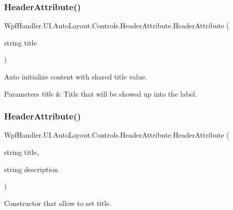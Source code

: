 \subsubsection{\texorpdfstring{Header\+Attribute()}{HeaderAttribute()}\hspace{0.1cm}{\footnotesize\ttfamily [1/4]}}
{\footnotesize\ttfamily Wpf\+Handler.\+U\+I.\+Auto\+Layout.\+Controls.\+Header\+Attribute.\+Header\+Attribute (\begin{DoxyParamCaption}\item[{string}]{title }\end{DoxyParamCaption})}



Auto initialize content with shared title value. 


\begin{DoxyParams}{Parameters}
{\em title} & Title that will be showed up into the label.\\
\hline
\end{DoxyParams}
\mbox{\label{class_wpf_handler_1_1_u_i_1_1_auto_layout_1_1_controls_1_1_header_attribute_aa89774276da07f96c045d13506488df3}} 
\subsubsection{\texorpdfstring{Header\+Attribute()}{HeaderAttribute()}\hspace{0.1cm}{\footnotesize\ttfamily [2/4]}}
{\footnotesize\ttfamily Wpf\+Handler.\+U\+I.\+Auto\+Layout.\+Controls.\+Header\+Attribute.\+Header\+Attribute (\begin{DoxyParamCaption}\item[{string}]{title,  }\item[{string}]{description }\end{DoxyParamCaption})}



Constructor that allow to set title. 


